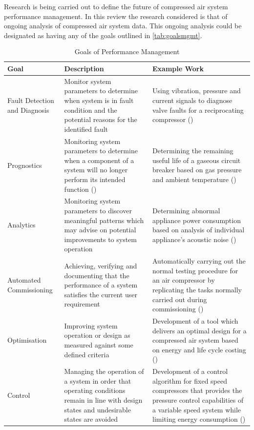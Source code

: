Research is being carried out to define the future of compressed air system performance management. In this review the research considered is that of ongoing analysis of compressed air system data. This ongoing analysis could be designated as having any of the goals outlined in \autoref{tab:goalsmgmt}.

\begin{table}
  \centering
  \caption{Goals of Performance Management}
    \begin{tabular}{p{.3\linewidth}p{.3\linewidth}p{.3\linewidth}}
    \toprule
    Goal  & Description & Example Work \\
    \midrule
    Fault Detection and Diagnosis & Monitor system parameters to determine when system is in fault condition and the potential reasons for the identified fault & Using vibration, pressure and current signals to diagnose valve faults for a reciprocating compressor (\cite{Tran2014}) \\
    \midrule
    Prognostics & Monitoring system parameters to determine when a component of a system will no longer perform its intended function (\cite{Vachtsevanos2006}) & Determining the remaining useful life of a gaseous circuit breaker  based on gas pressure and ambient temperature (\cite{Catterson2013}) \\
    \midrule
    Analytics & Monitoring system parameters to discover meaningful patterns which may advise on potential improvements to system operation & Determining abnormal appliance power consumption based on analysis of individual appliance’s acoustic noise (\cite{Pathak2015}) \\
    \midrule
    Automated Commissioning & Achieving, verifying and documenting that the performance of a system satisfies the current user requirement & Automatically carrying out the normal testing procedure for an air compressor by replicating the tasks normally carried out during commissioning (\cite{Mazid2008}) \\
    \midrule
    Optimisation & Improving system operation or design as measured against some defined criteria & Development of a tool which delivers an optimal design for a compressed air system based on energy and life cycle costing (\cite{Friden2012}) \\
    \midrule
    Control & Managing the operation of a system in order that operating conditions remain in line with design states and undesirable states are avoided & Development of a control algorithm for fixed speed compressors that provides the pressure control capabilities of a variable speed system while limiting energy consumption (\cite{Facchinetti}) \\
    \bottomrule
    \end{tabular}%
  \label{tab:goalsmgmt}%
\end{table}%

